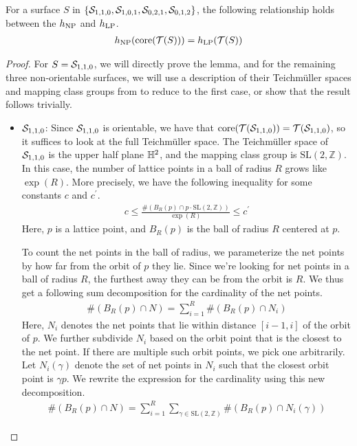 \documentclass[12pt, reqno]{amsart}
\begin{document}

\begin{lemma}
  For a surface $S$ in $\left\{ \mathcal{S}_{1,1,0}, \mathcal{S}_{1,0,1}, \mathcal{S}_{0,2,1}, \mathcal{S}_{0,1,2} \right\}$, the following relationship holds between the $h_{\mathrm{NP}}$ and $h_{\mathrm{LP}}$.
  \begin{align*}
    h_{\mathrm{NP}}(\mathrm{core}(\mathcal{T}(S))) = h_{\mathrm{LP}}(\mathcal{T}(S))
  \end{align*}
\end{lemma}

\begin{proof}
  For $S = \mathcal{S}_{1,1,0}$, we will directly prove the lemma, and for the remaining three non-orientable surfaces, we will use a description of their Teichmüller spaces and mapping class groups from \textcite{gendulphe2017whats} to reduce to the first case, or show that the result follows trivially.
  \begin{itemize}
  \item $\mathcal{S}_{1,1,0}$: Since $\mathcal{S}_{1,1,0}$ is orientable, we have that $\mathrm{core(\mathcal{T}(\mathcal{S}_{1,1,0}))} = \mathcal{T}(\mathcal{S}_{1,1,0})$, so it suffices to look at the full Teichmüller space.
    The Teichmüller space of $\mathcal{S}_{1,1,0}$ is the upper half plane $\mathbb{H}^2$, and the mapping class group is $\mathrm{SL}(2, \mathbb{Z})$.
    In this case, the number of lattice points in a ball of radius $R$ grows like $\exp(R)$.
    More precisely, we have the following inequality for some constants $c$ and $c^\prime$.
    \begin{align}
      c \leq \frac{\#\left( B_R(p) \cap p \cdot \mathrm{SL}(2, \mathbb{Z}) \right)}{\exp(R)} \leq c^{\prime} \label{eq:lattice-point-count}
    \end{align}
    Here, $p$ is a lattice point, and $B_R(p)$ is the ball of radius $R$ centered at $p$.

    To count the net points in the ball of radius, we parameterize the net points by how far from the orbit of $p$ they lie. Since we're looking for net points in a ball of radius $R$, the furthest away they can be from the orbit is $R$.
    We thus get a following sum decomposition for the cardinality of the net points.
    \begin{align*}
      \#\left( B_R(p) \cap N \right) = \sum_{i=1}^R \#\left( B_R(p) \cap N_i \right)
    \end{align*}
    Here, $N_i$ denotes the net points that lie within distance $[i-1, i]$ of the orbit of $p$.
    We further subdivide $N_i$ based on the orbit point that is the closest to the net point. If there are multiple such orbit points, we pick one arbitrarily.
    Let $N_i(\gamma)$ denote the set of net points in $N_i$ such that the closest orbit point is $\gamma p$.
    We rewrite the expression for the cardinality using this new decomposition.
    \begin{align}
      \#\left( B_R(p) \cap N \right) = \sum_{i=1}^R \sum_{\gamma \in \mathrm{SL}(2, \mathbb{Z})} \#\left( B_R(p) \cap N_i(\gamma) \right) \label{eq:net-point-count}
    \end{align}


\end{itemize}
\end{proof}
\end{document}

